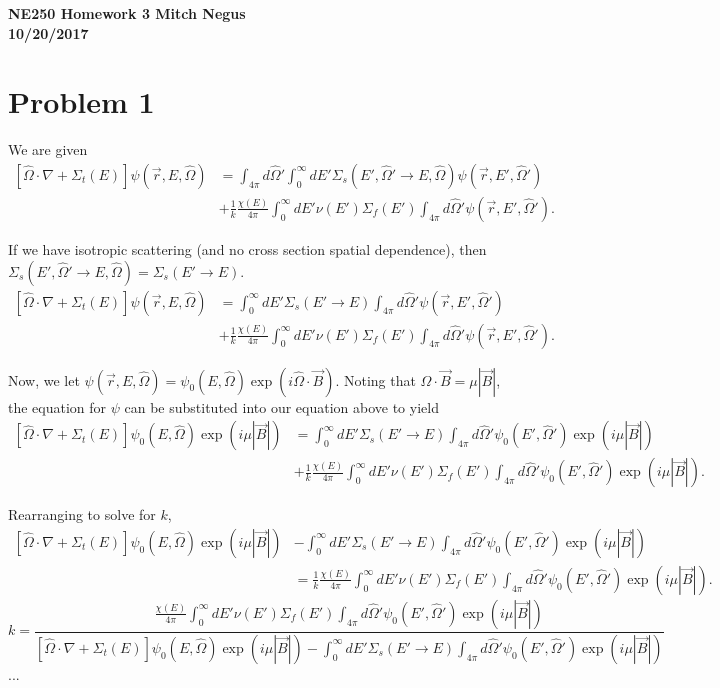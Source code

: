 \documentclass{article}
\newcommand{\Xs}{\Sigma}
\newcommand{\pos}{\vec{r}}
\newcommand{\Oh}{\hat{\Omega}}
\newcommand{\intfp}{\int_{4\pi}}
\newcommand{\intzi}{\int_0^{\infty}}
\newcommand{\rEO}{(\pos,E,\Oh)}
\newcommand{\rEOprime}{(\pos,E',\Oh')}
\newcommand{\EO}{(E,\Oh)}
\newcommand{\EOprime}{(E',\Oh')}
\begin{document}
\thispagestyle{empty}

{\bf {\large {NE250 Homework {3} \hfill Mitch Negus\\
		\hspace*{\fill} 10/20/2017\\ }}}
		
		
		

\section*{Problem 1}

We are given
\begin{align*}
\left[\Oh \cdot \nabla + \Xs_t(E) \right] \psi\rEO &= \intfp d\Oh' \intzi dE' \Xs_s(E',\Oh' \rightarrow E,\Oh)\psi\rEOprime \\
&+ \frac{1}{k}\frac{\chi(E)}{4\pi} \intzi dE' \nu(E') \Xs_f(E') \intfp d\Oh' \psi\rEOprime.
\end{align*}

If we have isotropic scattering (and no cross section spatial dependence), then $\Xs_s(E',\Oh' \rightarrow E,\Oh) = \Xs_s(E' \rightarrow E)$.
\begin{align*}
\left[\Oh \cdot \nabla + \Xs_t(E) \right] \psi\rEO &= \intzi dE' \Xs_s(E' \rightarrow E) \intfp d\Oh' \psi\rEOprime \\
&+ \frac{1}{k}\frac{\chi(E)}{4\pi} \intzi dE' \nu(E') \Xs_f(E') \intfp d\Oh' \psi\rEOprime.
\end{align*}

Now, we let $\psi\rEO = \psi_0\EO\exp(i \Oh \cdot \vec{B})$. Noting that $\Oh \cdot \vec{B} = \mu|\vec{B}|$, the equation for $\psi$ can be substituted into our equation above to yield
\begin{align*}
\left[\Oh \cdot \nabla + \Xs_t(E) \right] \psi_0\EO\exp(i \mu|\vec{B}|) &= \intzi dE' \Xs_s(E' \rightarrow E) \intfp d\Oh' \psi_0\EOprime\exp(i \mu|\vec{B}|) \\
&+ \frac{1}{k}\frac{\chi(E)}{4\pi} \intzi dE' \nu(E') \Xs_f(E') \intfp d\Oh' \psi_0\EOprime\exp(i \mu|\vec{B}|).
\end{align*}

Rearranging to solve for $k$,
\begin{align*}
\left[\Oh \cdot \nabla + \Xs_t(E) \right] \psi_0\EO\exp(i \mu|\vec{B}|) &- \intzi dE' \Xs_s(E' \rightarrow E) \intfp d\Oh' \psi_0\EOprime\exp(i \mu|\vec{B}|) \\
& = \frac{1}{k}\frac{\chi(E)}{4\pi} \intzi dE' \nu(E') \Xs_f(E') \intfp d\Oh' \psi_0\EOprime\exp(i \mu|\vec{B}|).
\end{align*}
$$ k = \frac{\frac{\chi(E)}{4\pi} \intzi dE' \nu(E') \Xs_f(E') \intfp d\Oh' \psi_0\EOprime\exp(i \mu|\vec{B}|)}{\left[\Oh \cdot \nabla + \Xs_t(E) \right] \psi_0\EO\exp(i \mu|\vec{B}|) - \intzi dE' \Xs_s(E' \rightarrow E) \intfp d\Oh' \psi_0\EOprime\exp(i \mu|\vec{B}|)} $$
...
\end{document}
